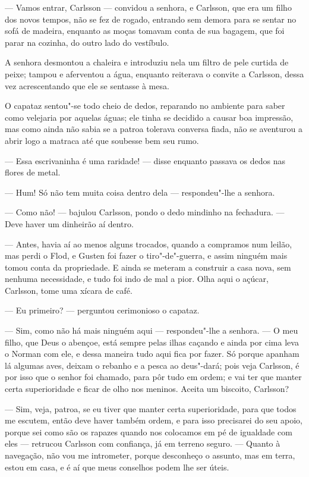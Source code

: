 --- Vamos entrar, Carlsson --- convidou a senhora, e Carlsson, que era um filho dos
novos tempos, não se fez de rogado, entrando sem demora para se sentar no sofá
de madeira, enquanto as moças tomavam conta de sua bagagem, que foi parar na
cozinha, do outro lado do vestíbulo.

A senhora desmontou a chaleira e introduziu nela um filtro de pele curtida de
peixe; tampou e aferventou a água, enquanto reiterava o convite a Carlsson,
dessa vez acrescentando que ele se sentasse à mesa.

O capataz sentou"-se todo cheio de dedos, reparando no ambiente para saber como
velejaria por aquelas águas; ele tinha se decidido a causar boa impressão,
mas como ainda não sabia se a patroa tolerava conversa fiada, não se
aventurou a abrir logo a matraca até que soubesse bem seu rumo.

--- Essa escrivaninha é uma raridade! --- disse enquanto passava os dedos nas
flores de metal.

--- Hum! Só não tem muita coisa dentro dela --- respondeu"-lhe a senhora.

--- Como não! --- bajulou Carlsson, pondo o dedo mindinho na fechadura. --- Deve
haver um dinheirão aí dentro.

--- Antes, havia aí ao menos alguns trocados, quando a compramos num leilão, mas
perdi o Flod, e Gusten foi fazer o tiro"-de"-guerra, e assim ninguém mais tomou
conta da propriedade. E ainda se meteram a construir a casa nova, sem nenhuma
necessidade, e tudo foi indo de mal a pior. Olha aqui o açúcar, Carlsson, tome
uma xícara de café.

--- Eu primeiro? --- perguntou cerimonioso o capataz.

--- Sim, como não há mais ninguém aqui --- respondeu"-lhe a senhora. --- O meu filho,
que Deus o abençoe, está sempre pelas ilhas caçando e ainda por cima leva o Norman
com ele, e dessa maneira tudo aqui fica por fazer. Só porque apanham lá algumas
aves, deixam o rebanho e a pesca ao deus"-dará; pois veja Carlsson, é por isso
que o senhor foi chamado, para pôr tudo em ordem; e vai ter que manter
certa superioridade e ficar de olho nos meninos. Aceita um biscoito, Carlsson?

--- Sim, veja, patroa, se eu tiver que manter certa superioridade, para que todos me
escutem, então deve haver também ordem, e para isso precisarei do seu apoio,
porque sei como são os rapazes quando nos colocamos em pé de igualdade com eles
--- retrucou Carlsson com confiança, já em terreno seguro. --- Quanto à navegação,
não vou me intrometer, porque desconheço o assunto, mas em terra, estou em
casa, e é aí que meus conselhos podem lhe ser úteis.

